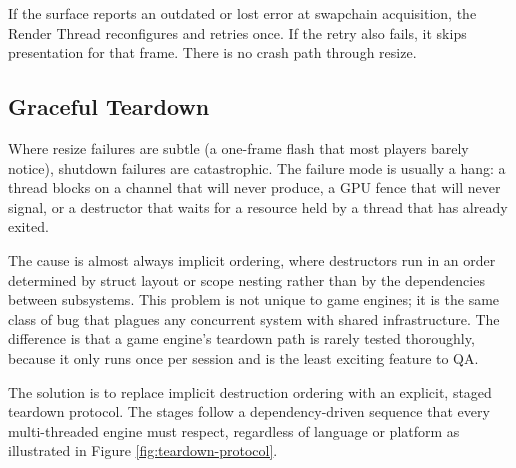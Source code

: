 \documentclass[
  11pt,
  letterpaper,
  DIV=11,
  numbers=noendperiod,
  twoside,
  open=right]{scrreprt}
\begin{document}
If the surface reports an outdated or lost error at swapchain
acquisition, the Render Thread reconfigures and retries once. If the
retry also fails, it skips presentation for that frame. There is no
crash path through resize.

\subsection{Graceful Teardown}\label{graceful-teardown}

Where resize failures are subtle (a one-frame flash that most players
barely notice), shutdown failures are catastrophic. The failure mode is
usually a hang: a thread blocks on a channel that will never produce, a
GPU fence that will never signal, or a destructor that waits for a
resource held by a thread that has already exited.

The cause is almost always implicit ordering, where destructors run in
an order determined by struct layout or scope nesting rather than by the
dependencies between subsystems. This problem is not unique to game
engines; it is the same class of bug that plagues any concurrent system
with shared infrastructure. The difference is that a game engine's
teardown path is rarely tested thoroughly, because it only runs once per
session and is the least exciting feature to QA.



The solution is to replace implicit destruction ordering with an
explicit, staged teardown protocol. The stages follow a
dependency-driven sequence that every multi-threaded engine must
respect, regardless of language or platform as illustrated in Figure
\ref{fig:teardown-protocol}.
\end{document}
